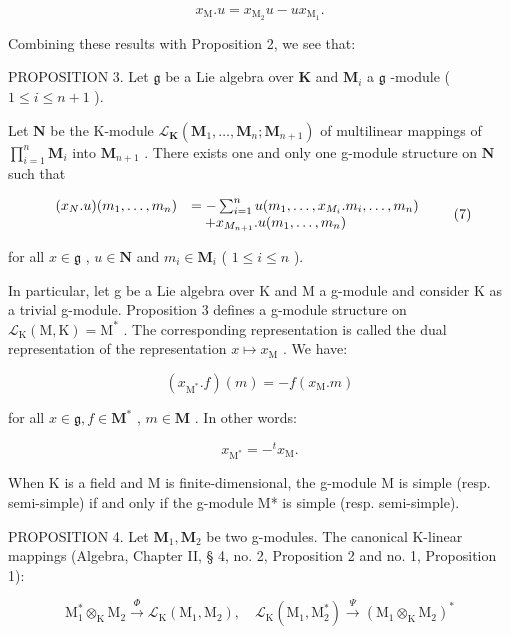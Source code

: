 \[
x _ {\mathrm{M}}. u = x _ {\mathrm{M} _ {2}} u - u x _ {\mathrm{M} _ {1}}.\tag{6}
\]

Combining these results with Proposition 2, we see that:

PROPOSITION 3. Let \(\mathfrak{g}\) be a Lie algebra over \(\mathbf{K}\) and \(\mathbf{M}_i\) a \(\mathfrak{g}\) -module ( \(1 \leqslant i \leqslant n + 1\) ).

Let \(\mathbf{N}\) be the K-module \(\mathcal{L}_{\mathbf{K}}(\mathbf{M}_1, \ldots, \mathbf{M}_n; \mathbf{M}_{n+1})\) of multilinear mappings of \(\prod_{i=1}^{n} \mathbf{M}_i\) into \(\mathbf{M}_{n+1}\) . There exists one and only one g-module structure on \(\mathbf{N}\) such that

\[
\begin{array}{r l} (x _ {N}. u) (m _ {1}, \ldots , m _ {n}) & = - \sum_ {i = 1} ^ {n} u (m _ {1}, \ldots , x _ {M _ {i}}. m _ {i}, \ldots , m _ {n}) \\ & \quad + x _ {M _ {n + 1}}. u (m _ {1}, \ldots , m _ {n}) \end{array}\tag{7}
\]

for all \(x \in \mathfrak{g}\) , \(u \in \mathbf{N}\) and \(m_i \in \mathbf{M}_i\) ( \(1 \leqslant i \leqslant n\) ).

In particular, let g be a Lie algebra over K and M a g-module and consider K as a trivial g-module. Proposition 3 defines a g-module structure on \(\mathcal{L}_{\mathrm{K}}(\mathrm{M},\mathrm{K}) = \mathrm{M}^{*}\) . The corresponding representation is called the dual representation of the representation \(x\mapsto x_{\mathrm{M}}\) . We have:

\[
(x _ {\mathrm{M} ^ {*}}. f) (m) = - f (x _ {\mathrm{M}}. m)\tag{8}
\]

for all \(x \in \mathfrak{g}, f \in \mathbf{M}^*\) , \(m \in \mathbf{M}\) . In other words:

\[
x _ {\mathrm{M} ^ {*}} = - ^ {t} x _ {\mathrm{M}}.\tag{9}
\]

When K is a field and M is finite-dimensional, the g-module M is simple (resp. semi-simple) if and only if the g-module M* is simple (resp. semi-simple).

PROPOSITION 4. Let \(\mathbf{M}_1, \mathbf{M}_2\) be two g-modules. The canonical K-linear mappings (Algebra, Chapter II, § 4, no. 2, Proposition 2 and no. 1, Proposition 1):

\[
\mathrm{M} _ {1} ^ {*} \otimes_ {\mathrm{K}} \mathrm{M} _ {2} \xrightarrow {\Phi} \mathscr {L} _ {\mathrm{K}} (\mathrm{M} _ {1}, \mathrm{M} _ {2}), \quad \mathscr {L} _ {\mathrm{K}} (\mathrm{M} _ {1}, \mathrm{M} _ {2} ^ {*}) \xrightarrow {\Psi} (\mathrm{M} _ {1} \otimes_ {\mathrm{K}} \mathrm{M} _ {2}) ^ {*}
\]

